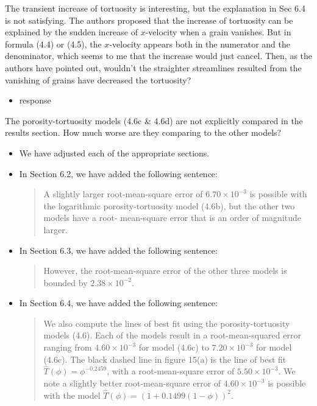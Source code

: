 \documentclass[11pt]{article}
\newcommand{\comment}[1]{{\color{blue} #1}}
\begin{document}
\noindent
\comment{The transient increase of tortuosity is interesting, but the
explanation in Sec 6.4 is not satisfying. The authors proposed that the
increase of tortuosity can be explained by the sudden increase of
$x$-velocity when a grain vanishes. But in formula (4.4) or (4.5), the
$x$-velocity appears both in the numerator and the denominator, which
seems to me that the increase would just cancel. Then, as the authors
have pointed out, wouldn't the straighter streamlines resulted from the
vanishing of grains have decreased the tortuosity?}
\begin{itemize}
  \item response
\end{itemize}

\noindent
\comment{The porosity-tortuosity models (4.6c \& 4.6d) are not
explicitly compared in the results section. How much worse are they
comparing to the other models?}
\begin{itemize}
  \item We have adjusted each of the appropriate sections.

  \item In Section 6.2, we have added the following sentence:
    \begin{quotation}
      \noindent
      A slightly larger root-mean-square error of $6.70 \times 10^{-3}$
      is possible with the logarithmic porosity-tortuosity model (4.6b),
      but the other two models have a root- mean-square error that is an
      order of magnitude larger.
    \end{quotation}


  \item In Section 6.3, we have added the following sentence:
    \begin{quotation}
      \noindent
      However, the root-mean-square error of the other three models is
      bounded by $2.38 \times 10^{-2}$.
    \end{quotation}

  \item In Section 6.4, we have added the following sentence:
    \begin{quotation}
      \noindent
      We also compute the lines of best fit using the
      porosity-tortuosity models (4.6).  Each of the models result in a
      root-mean-squared error ranging from $4.60 \times 10^{-3}$ for
      model (4.6c) to $7.20 \times 10^{-3}$ for model (4.6c). The black
      dashed line in figure 15(a) is the line of best fit
      $\widehat{T}(\phi) = \phi^{-0.2459}$, with a root-mean-square
      error of $5.50 \times 10^{-3}$.  We note a slightly better
      root-mean-square error of $4.60 \times 10^{-3}$ is possible with
      the model $\widehat{T}(\phi) = \left(1 + 0.1499(1-\phi)\right)^2$.
    \end{quotation}

\end{itemize}
\end{document}
